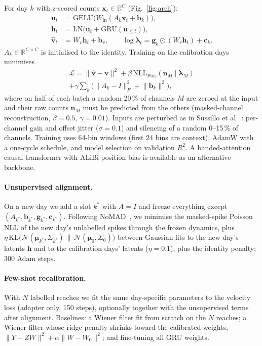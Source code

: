 \documentclass[10pt,twocolumn]{article}
\begin{document}
For day $k$ with z-scored counts $\mathbf{x}_t\in\mathbb{R}^{C}$ (Fig.~\ref{fig:arch}):
\begin{align}
  \mathbf{u}_t &= \mathrm{GELU}\big(W_{\mathrm{in}}(A_k\mathbf{x}_t + \mathbf{b}_k)\big), \\
  \mathbf{h}_t &= \mathrm{LN}\big(\mathbf{u}_t + \mathrm{GRU}(\mathbf{u}_{\le t})\big), \\
  \hat{\mathbf{v}}_t &= W_v\mathbf{h}_t + \mathbf{b}_v, \qquad
  \log\bm{\lambda}_t = \mathbf{g}_k\odot(W_r\mathbf{h}_t) + \mathbf{c}_k .
\end{align}
$A_k\in\mathbb{R}^{C\times C}$ is initialised to the identity. Training on the calibration
days minimises
\begin{multline}
  \mathcal{L} = \lVert\hat{\mathbf{v}}-\mathbf{v}\rVert^2
  + \beta\,\mathrm{NLL}_{\text{Pois}}\!\left(\mathbf{n}_M \mid \bm\lambda_M\right) \\
  + \gamma\textstyle\sum_k\big(\lVert A_k-I\rVert_F^2+\lVert\mathbf{b}_k\rVert^2\big),
\end{multline}
where on half of each batch a random 20\,\% of channels $M$ are zeroed at the input and their
raw counts $\mathbf{n}_M$ must be predicted from the others (masked-channel reconstruction,
$\beta=0.5$, $\gamma=0.01$). Inputs are perturbed as in Sussillo et al.~\cite{sussillo2016making}:
per-channel gain and offset jitter ($\sigma=0.1$) and silencing of a random 0--15\,\% of
channels. Training uses 64-bin windows (first 24 bins are context), AdamW with a one-cycle
schedule, and model selection on validation $R^2$. A banded-attention causal transformer
with ALiBi position bias is available as an alternative backbone.

\paragraph{Unsupervised alignment.} On a new day we add a slot $k^\ast$ with $A=I$ and
freeze everything except $(A_{k^\ast},\mathbf{b}_{k^\ast},\mathbf{g}_{k^\ast},\mathbf{c}_{k^\ast})$.
Following NoMAD~\cite{karpowicz2025nomad}, we minimise the masked-spike Poisson NLL of the
new day's unlabelled spikes through the frozen dynamics, plus
$\eta\,\mathrm{KL}\big(\mathcal N(\bm\mu_{k^\ast},\Sigma_{k^\ast})\,\|\,\mathcal N(\bm\mu_0,\Sigma_0)\big)$
between Gaussian fits to the new day's latents $\mathbf{h}$ and to the calibration days' latents
($\eta=0.1$), plus the identity penalty; 300 Adam steps.

\paragraph{Few-shot recalibration.} With $N$ labelled reaches we fit the same day-specific
parameters to the velocity loss (adapter only, 150 steps), optionally together with the
unsupervised terms after alignment. Baselines: a Wiener filter fit from scratch on the $N$
reaches; a Wiener filter whose ridge penalty shrinks toward the calibrated weights,
$\lVert Y-ZW\rVert^2+\alpha\lVert W-W_0\rVert^2$; and fine-tuning all GRU weights.
\end{document}
